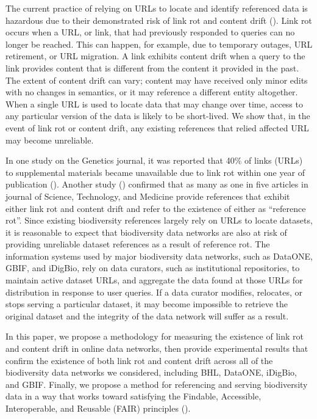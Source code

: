 \documentclass[12pt,letterpaper]{article}
\begin{document}
The current practice of relying on URLs to locate and identify referenced data is hazardous due to their demonstrated risk of link rot and content drift (\cite{Klein_2014}). Link rot occurs when a URL, or link, that had previously responded to queries can no longer be reached. This can happen, for example, due to temporary outages, URL retirement, or URL migration. A link exhibits content drift when a query to the link provides content that is different from the content it provided in the past. The extent of content drift can vary; content may have received only minor edits with no changes in semantics, or it may reference a different entity altogether. When a single URL is used to locate data that may change over time, access to any particular version of the data is likely to be short-lived. We show that, in the event of link rot or content drift, any existing references that relied affected URL may become unreliable.

In one study on the Genetics journal, it was reported that 40\% of links (URLs) to supplemental materials became unavailable due to link rot within one year of publication (\cite{Vision_2010}). Another study (\cite{Klein_2014}) confirmed that as many as one in five articles in journal of Science, Technology, and Medicine provide references that exhibit either link rot and content drift and refer to the existence of either as “reference rot”. Since existing biodiversity references largely rely on URLs to locate datasets, it is reasonable to expect that biodiversity data networks are also at risk of providing unreliable dataset references as a result of reference rot. The information systems used by major biodiversity data networks, such as DataONE, GBIF, and iDigBio, rely on data curators, such as institutional repositories, to maintain active dataset URLs, and aggregate the data found at those URLs for distribution in response to user queries. If a data curator modifies, relocates, or stops serving a particular dataset, it may become impossible to retrieve the original dataset and the integrity of the data network will suffer as a result.

In this paper, we propose a methodology for measuring the existence of link rot and content drift in online data networks, then provide experimental results that confirm the existence of both link rot and content drift across all of the biodiversity data networks we considered, including BHL, DataONE, iDigBio, and GBIF. Finally, we propose a method for referencing and serving biodiversity data in a way that works toward satisfying the Findable, Accessible, Interoperable, and Reusable (FAIR) principles (\cite{Wilkinson_2016}).
\end{document}
